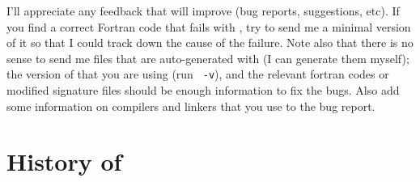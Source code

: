 I'll appreciate any feedback that will improve \fpy (bug reports,
suggestions, etc). If you find a correct Fortran code that fails with
\fpy, try to send me a minimal version of it so that I could track
down the cause of the failure. Note also that there is no sense to
send me files that are auto-generated with \fpy (I can generate them
myself); the version of \fpy that you are using (run \texttt{\fpy\ 
  -v}), and the relevant fortran codes or modified signature files
should be enough information to fix the bugs. Also add some
information on compilers and linkers that you use to the bug report.


\section{History of \fpy}
\label{sec:history}

